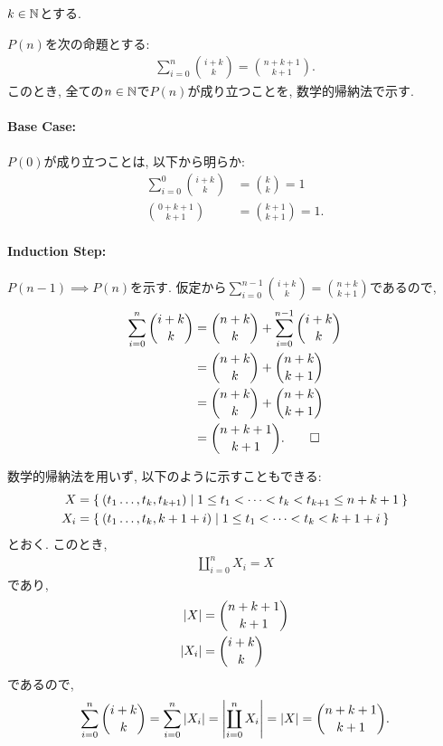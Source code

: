 \begin{proof*}
  $k\in \mathbb{N}$とする.
  
  $P(n)$を次の命題とする:
  \begin{align*}
    \sum_{i=0}^n \binom{i+k}{k}=\binom{n+k+1}{k+1}.
  \end{align*}
  このとき,
  全ての$n\in\mathbb{N}$で$P(n)$が成り立つことを,
  数学的帰納法で示す.

  \paragraph{Base Case:}
  $P(0)$が成り立つことは, 以下から明らか:
  \begin{align*}
    \sum_{i=0}^0 \binom{i+k}{k}&=\binom{k}{k}=1\\
    \binom{0+k+1}{k+1}&=\binom{k+1}{k+1}=1.
  \end{align*}

  \paragraph{Induction Step:}
  $P(n-1)\implies P(n)$を示す.
  仮定から$\sum_{i=0}^{n-1} \binom{i+k}{k}=\binom{n+k}{k+1}$であるので,
  \begin{align*}
    \sum_{i=0}^n \binom{i+k}{k}
    &=\binom{n+k}{k} +\sum_{i=0}^{n-1} \binom{i+k}{k}\\
    &=\binom{n+k}{k} + \binom{n+k}{k+1}\\
    &=\binom{n+k}{k} + \binom{n+k}{k+1}\\
    &=\binom{n+k+1}{k+1}
    .\qedhere
  \end{align*}
\end{proof*}

\begin{rem}
  数学的帰納法を用いず, 以下のように示すこともできる:
  \begin{align*}
    X&=\Set{(t_1\ldots,t_k,t_{k+1})|1\leq t_1<\cdots < t_k<t_{k+1} \leq  n+k+1}\\
    X_i&=\Set{(t_1\ldots,t_{k},k+1+i)|1\leq t_1<\cdots < t_k <k+1+i }
  \end{align*}
  とおく. このとき,
  \begin{align*}
    \coprod_{i=0}^{n}X_i = X
  \end{align*}
  であり,
  \begin{align*}
    \left|X\right|&=\binom{n+k+1}{k+1}\\
    \left|X_i\right|&=\binom{i+k}{k}
  \end{align*}
  であるので,
  \begin{align*}
    \sum_{i=0}^{n}\binom{i+k}{k}=\sum_{i=0}^{n}\left|X_i\right|
    =\left|\coprod_{i=0}^{n}X_i\right|= \left|X\right|=\binom{n+k+1}{k+1}.
  \end{align*}
\end{rem}

